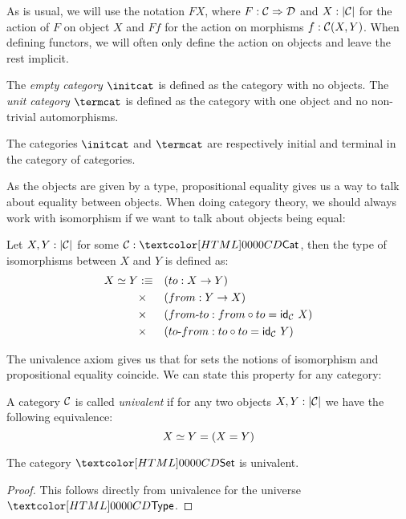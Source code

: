 As is usual, we will use the notation $F X$, where
$F : \mathcal{C} \Rightarrow \mathcal{D}$ and $X : | \mathcal{C} |$ for the action of $F$ on
object $X$ and $F f$ for the action on morphisms $f : \mathcal{C}(X,Y)$. When
defining functors, we will often only define the action on objects and
leave the rest implicit.

\begin{definition}
  The \emph{empty category} $\initcat$ is defined as the category with
  no objects. The \emph{unit category} $\termcat$ is defined as the
  category with one object and no non-trivial automorphisms.
\end{definition}

The categories $\initcat$ and $\termcat$ are respectively initial and
terminal in the category of categories.

As the objects are given by a type, propositional equality gives us a
way to talk about equality between objects. When doing category
theory, we should always work with isomorphism if we want to talk
about objects being equal:

\begin{definition}[Isomorphism]
  Let $X, Y : | \mathcal{C} |$ for some $\Cc : \Cat$, then the type of
  isomorphisms between $X$ and $Y$ is defined as:
  \begin{align*}
    \Iso{X}{Y} &\ddefeq &&(to : X \to Y) \\
               &\times &&(from : Y \to X) \\
               &\times &&(\identalt{from-to} : from \circ to = \id_{\Cc}\ X) \\
               &\times &&(\identalt{to-from} : to \circ to = \id_{\Cc}\ Y)
  \end{align*}
\end{definition}

The univalence axiom gives us that for sets the notions of isomorphism
and propositional equality coincide. We can state this property for
any category:

\begin{definition}
  A category $\mathcal{C}$ is called \emph{univalent} if for any two objects
  $X, Y : | \mathcal{C} |$ we have the following equivalence:
  $$
  X \simeq Y = (X = Y)
  $$  
\end{definition}

\begin{proposition}
  The category $\Set$ is univalent.
\end{proposition}

\begin{proof}
  This follows directly from univalence for the universe $\Type$.
\end{proof}

